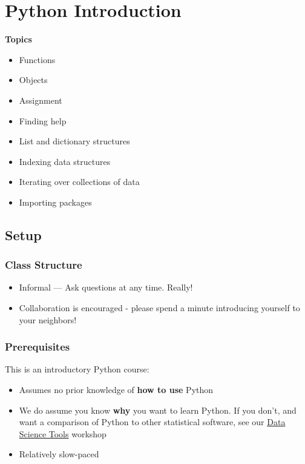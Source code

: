 \documentclass[
]{book}
\providecommand{\tightlist}{%
  \setlength{\itemsep}{0pt}\setlength{\parskip}{0pt}}
\begin{document}
\hypertarget{python-introduction}{%
\chapter{Python Introduction}\label{python-introduction}}

\textbf{Topics}

\begin{itemize}
\tightlist
\item
  Functions
\item
  Objects
\item
  Assignment
\item
  Finding help
\item
  List and dictionary structures
\item
  Indexing data structures
\item
  Iterating over collections of data
\item
  Importing packages
\end{itemize}

\hypertarget{setup-4}{%
\section{Setup}\label{setup-4}}

\hypertarget{class-structure-4}{%
\subsection{Class Structure}\label{class-structure-4}}

\begin{itemize}
\tightlist
\item
  Informal --- Ask questions at any time. Really!
\item
  Collaboration is encouraged - please spend a minute introducing yourself to your neighbors!
\end{itemize}

\hypertarget{prerequisites-4}{%
\subsection{Prerequisites}\label{prerequisites-4}}

This is an introductory Python course:

\begin{itemize}
\tightlist
\item
  Assumes no prior knowledge of \textbf{how to use} Python
\item
  We do assume you know \textbf{why} you want to learn Python. If you don't, and want a comparison of Python to other statistical software, see our \href{./DataScienceTools.html}{Data Science Tools} workshop
\item
  Relatively slow-paced
\end{itemize}
\end{document}

